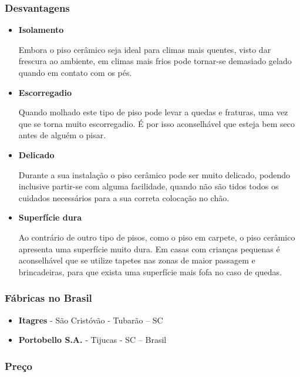\subsubsection*{\textbf{Desvantagens}}

	\begin{itemize}

	\item \textbf{Isolamento}

	Embora o piso cerâmico seja ideal para climas mais quentes, visto dar frescura ao ambiente, em climas mais frios pode tornar-se demasiado gelado quando em contato com os pés.

	\item \textbf{Escorregadio}
	
	Quando molhado este tipo de piso pode levar a quedas e fraturas, uma vez que se torna muito escorregadio. É por isso aconselhável que esteja bem seco antes de alguém o pisar.

	\item \textbf{Delicado}
	
	Durante a sua instalação o piso cerâmico pode ser muito delicado, podendo inclusive partir-se com alguma facilidade, quando não são tidos todos os cuidados necessários para a sua correta colocação no chão.

	\item \textbf{Superfície dura}
	
	Ao contrário de outro tipo de pisos, como o piso em carpete, o piso cerâmico apresenta uma superfície muito dura. Em casas com crianças pequenas é aconselhável que se utilize tapetes nas zonas de maior passagem e brincadeiras, para que exista uma superfície mais fofa no caso de quedas.

	\end{itemize}

\subsubsection*{\textbf{Fábricas no Brasil}}

	\begin{itemize}

	\item \textbf{Itagres} - São Cristóvão - Tubarão – SC

	\item \textbf{Portobello S.A.} - Tijucas - SC – Brasil

	\end{itemize}

\subsubsection*{\textbf{Preço}}
	

